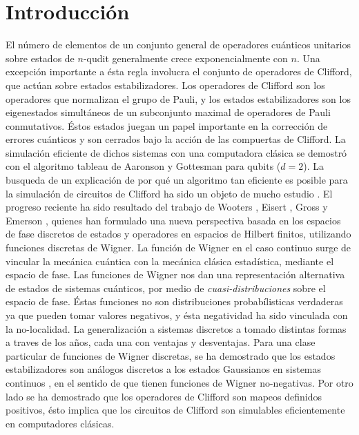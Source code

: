 \documentclass[a4paper,11pt]{report}
\begin{document}
  \tableofcontents

  \newpage
  \section{Introducción}

  El número de elementos de un conjunto general de
  operadores cuánticos unitarios sobre estados de $n$-qudit
  generalmente crece exponencialmente con $n$. Una excepción
  importante a ésta regla involucra el conjunto de
  operadores de Clifford, que actúan sobre estados
  estabilizadores. Los operadores de Clifford son los
  operadores que normalizan el grupo de Pauli, y los
  estados estabilizadores son los eigenestados simultáneos
  de un subconjunto maximal de operadores de Pauli
  conmutativos. Éstos estados juegan un papel importante
  en la corrección de errores cuánticos \cite{gottesman1998}
  y son cerrados bajo la acción de las compuertas de
  Clifford. La simulación eficiente de dichos sistemas con
  una computadora clásica se demostró con el algoritmo
  tableau de Aaronson y Gottesman \cite{aaronson2004,
  gottesman1998} para qubits ($d=2$). La busqueda de un
  explicación de por qué un algoritmo tan eficiente es
  posible para la simulación de circuitos de Clifford ha
  sido un objeto de mucho estudio \cite{gottesman1999,
  howard2014, mari2012}. El progreso reciente ha sido
  resultado del trabajo de Wooters \cite{wootters1987},
  Eisert \cite{mari2012}, Gross \cite{gross2006} y Emerson
  \cite{howard2014}, quienes han formulado una nueva
  perspectiva basada en los espacios de fase discretos de
  estados y operadores en espacios de Hilbert finitos,
  utilizando funciones discretas de Wigner.  La función de
  Wigner en el caso continuo surge de vincular la mecánica
  cuántica con la mecánica clásica estadística, mediante el
  espacio de fase. Las funciones de Wigner nos dan una
  representación alternativa de estados de sistemas
  cuánticos, por medio de \textit{cuasi-distribuciones}
  sobre el espacio de fase. Éstas funciones no son
  distribuciones probabílisticas verdaderas ya que pueden
  tomar valores negativos, y ésta negatividad ha sido
  vinculada con la no-localidad. La generalización a
  sistemas discretos a tomado distintas formas a traves de
  los años, cada una con ventajas y desventajas. Para una
  clase particular de funciones de Wigner discretas, se ha
  demostrado que los estados estabilizadores son análogos
  discretos a los estados Gaussianos en sistemas continuos
  \cite{gross2006}, en el sentido de que tienen funciones de
  Wigner no-negativas. Por otro lado se ha demostrado
  que los operadores de Clifford son mapeos definidos
  positivos, ésto implica que los circuitos de Clifford son
  simulables eficientemente en computadores clásicas.
\end{document}
